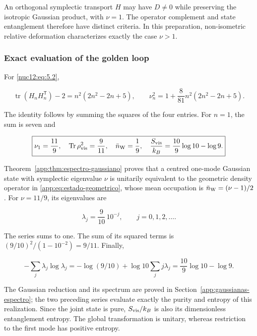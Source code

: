 An orthogonal symplectic transport \(H\) may have \(D\neq0\) while preserving the isotropic Gaussian product, with \(\nu=1\). The operator complement and state entanglement therefore have distinct criteria. In this preparation, non-isometric relative deformation characterizes exactly the case \(\nu>1\).

\subsubsection{Exact evaluation of the golden loop}

For \eqref{nuc12:eq:5.2},

\begin{equation}
\operatorname{tr}(H_nH_n^{\mathsf T})-2
=n^2(2n^2-2n+5),\qquad
\nu_n^2=1+\frac8{81}n^2(2n^2-2n+5).
\label{nuc12:eq:5.8}
\end{equation}

The identity follows by summing the squares of the four entries. For \(n=1\), the sum is seven and

\begin{equation}
\boxed{\nu_1=\frac{11}{9},\quad
\operatorname{Tr}\rho_{\rm vis}^2=\frac9{11},\quad
\bar n_{\rm W}=\frac19,\quad
\frac{S_{\rm vis}}{k_B}=\frac{10}{9}\log10-\log9.}
\label{nuc12:eq:5.9}
\end{equation}

Theorem~\ref{app:thm:espectro-gaussiano} proves that a centred one-mode Gaussian state with symplectic eigenvalue \(\nu\) is unitarily equivalent to the geometric density operator in \eqref{app:eq:estado-geometrico}, whose mean occupation is \(\bar n_{\rm W}=(\nu-1)/2\). For \(\nu=11/9\), its eigenvalues are

\begin{equation}
\lambda_j=\frac9{10}\,10^{-j},\qquad j=0,1,2,\ldots.
\label{nuc12:eq:5.10}
\end{equation}

The series sums to one. The sum of its squared terms is \((9/10)^2/(1-10^{-2})=9/11\). Finally,

\[
-\sum_j\lambda_j\log\lambda_j
=-\log(9/10)+\log10\sum_jj\lambda_j
=\frac{10}{9}\log10-\log9.
\]

The Gaussian reduction and its spectrum are proved in Section~\ref{app:gaussianas-espectro}; the two preceding series evaluate exactly the purity and entropy of this realization. Since the joint state is pure, \(S_{\rm vis}/k_B\) is also its dimensionless entanglement entropy. The global transformation is unitary, whereas restriction to the first mode has positive entropy.

